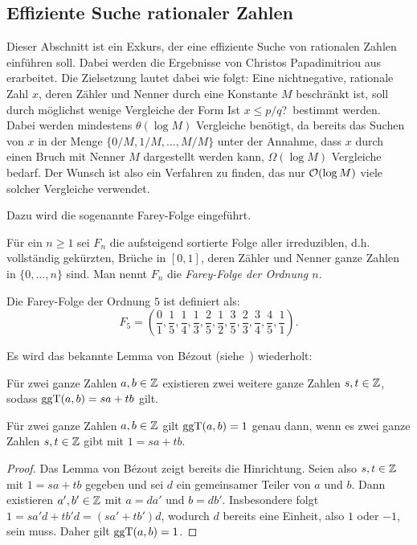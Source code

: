 \subsection{Effiziente Suche rationaler Zahlen}\label{sec-rational-search}

Dieser Abschnitt ist ein Exkurs, der eine effiziente Suche von rationalen Zahlen einführen soll.
Dabei werden die Ergebnisse von Christos Papadimitriou aus~\cite{Papadimitriou1979} erarbeitet.
Die Zielsetzung lautet dabei wie folgt:
Eine nichtnegative, rationale Zahl $x$, deren Zähler und Nenner durch eine Konstante $M$ beschränkt ist, soll durch möglichst wenige Vergleiche der Form \glqq Ist $x\leq p/q$?\grqq\ bestimmt werden.
Dabei werden mindestens $\theta(\log M)$ Vergleiche benötigt, da bereits das Suchen von $x$ in der Menge $\{ 0/M, 1/M, \dots, M/M \}$ unter der Annahme, dass $x$ durch einen Bruch mit Nenner $M$ dargestellt werden kann, $\Omega(\log M)$ Vergleiche bedarf.
Der Wunsch ist also ein Verfahren zu finden, das nur $\mathcal{O}(\log M)$ viele solcher Vergleiche verwendet.

Dazu wird die sogenannte Farey-Folge eingeführt.

\begin{definition}
	Für ein $n\geq 1$ sei $F_n$ die aufsteigend sortierte Folge aller irreduziblen, d.h. vollständig gekürzten, Brüche in $[0,1]$, deren Zähler und Nenner ganze Zahlen in $\{0, \dots, n\}$ sind.
	Man nennt $F_n$ die \emph{Farey-Folge der Ordnung $n$}.
\end{definition}

\begin{example}
	Die Farey-Folge der Ordnung $5$ ist definiert als:
	\[
		F_5 = \left( \frac{0}{1}, \frac{1}{5}, \frac{1}{4}, \frac{1}{3}, \frac{2}{5}, \frac{1}{2}, \frac{3}{5}, \frac{2}{3}, \frac{3}{4}, \frac{4}{5}, \frac{1}{1} \right).
	\]
\end{example}

Es wird das bekannte Lemma von Bézout (siehe~) wiederholt:
\begin{lemma}\label{lemma-von-bezout}
	Für zwei ganze Zahlen $a, b\in\mathbb{Z}$ existieren zwei weitere ganze Zahlen $s,t\in\mathbb{Z}$, sodass $\operatorname{ggT}(a,b) = sa + tb$ gilt.
\end{lemma}

\begin{corollary}\label{cor-bezout-reverted}
	Für zwei ganze Zahlen $a,b\in\mathbb{Z}$ gilt $\operatorname{ggT}(a,b) = 1$ genau dann, wenn es zwei ganze Zahlen $s,t\in\mathbb{Z}$ gibt mit $1 = sa + tb$.
\end{corollary}
\begin{proof}
	Das Lemma von Bézout zeigt bereits die Hinrichtung.
	Seien also $s,t\in\mathbb{Z}$ mit $1= sa +tb$ gegeben und sei $d$ ein gemeinsamer Teiler von $a$ und $b$.
	Dann existieren $a',b'\in\mathbb{Z}$ mit $a=d a'$ und $b=d b'$.
	Insbesondere folgt $1 = sa'd + tb'd = (sa' + tb') d$, wodurch $d$ bereits eine Einheit, also $1$ oder $-1$, sein muss.
	Daher gilt $\operatorname{ggT}(a,b)=1$.
\end{proof}

